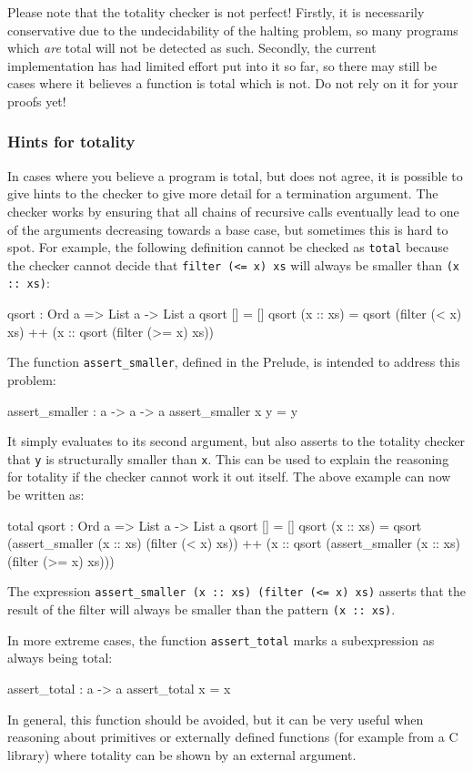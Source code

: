 Please note that the totality checker is not perfect! Firstly, it is necessarily
conservative due to the undecidability of the halting problem, so many programs
which \emph{are} total will not be detected as such. Secondly, the current
implementation has had limited effort put into it so far, so there may still
be cases where it believes a function is total which is not. Do not rely on it
for your proofs yet!

\subsubsection{Hints for totality}

In cases where you believe a program is total, but \Idris{} does not agree,
it is possible to give hints to the checker to give more detail for a
termination argument. The checker works by ensuring that all chains of
recursive calls eventually lead to one of the arguments decreasing towards
a base case, but sometimes this is hard to spot. For example, the following
definition cannot be checked as \texttt{total} because the checker cannot
decide that \texttt{filter (<= x) xs} will always be smaller than \texttt{(x :: xs)}:

\begin{code}
qsort : Ord a => List a -> List a
qsort [] = []
qsort (x :: xs)
   = qsort (filter (< x) xs) ++
      (x :: qsort (filter (>= x) xs))
\end{code}

\noindent
The function \texttt{assert\_smaller}, defined in the Prelude,
is intended to address this problem:

\begin{code}
assert_smaller : a -> a -> a
assert_smaller x y = y
\end{code}

\noindent
It simply evaluates to its second argument, but also asserts to the totality
checker that \texttt{y} is structurally smaller than \texttt{x}.  This can be
used to explain the reasoning for totality if the checker cannot work it out
itself. The above example can now be written as:

\begin{code}
total
qsort : Ord a => List a -> List a
qsort [] = []
qsort (x :: xs)
   = qsort (assert_smaller (x :: xs) (filter (< x) xs)) ++
      (x :: qsort (assert_smaller (x :: xs) (filter (>= x) xs)))
\end{code}

\noindent
The expression \texttt{assert\_smaller (x :: xs) (filter (<= x) xs)} asserts
that the result of the filter will always be smaller than the pattern
\texttt{(x :: xs)}.

In more extreme cases, the function \texttt{assert\_total} marks a
subexpression as always being total:

\begin{code}
assert_total : a -> a
assert_total x = x
\end{code}

\noindent
In general, this function should be avoided, but it can be very useful when
reasoning about primitives or externally defined functions (for example from
a C library) where totality can be shown by an external argument.

